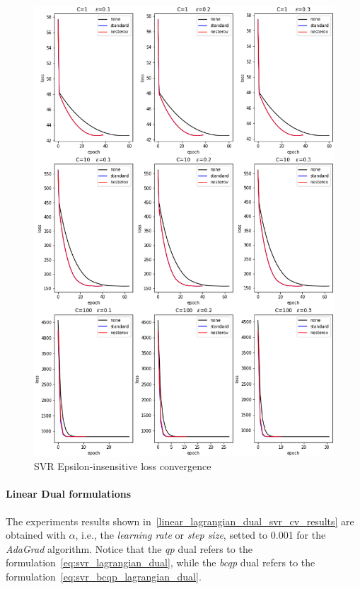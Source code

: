 \begin{figure}[H]
	\centering
	\includegraphics[scale=0.5]{img/svr_eps_loss_history}
	\caption{SVR Epsilon-insensitive loss convergence}
	\label{fig:svr_eps_loss_history}
\end{figure}

\pagebreak

\paragraph{Linear Dual formulations}

The experiments results shown in~\ref{linear_lagrangian_dual_svr_cv_results} are obtained with $\alpha$, i.e., the \emph{learning rate} or \emph{step size}, setted to 0.001 for the \emph{AdaGrad} algorithm. Notice that the \emph{qp} dual refers to the formulation~\eqref{eq:svr_lagrangian_dual}, while the \emph{bcqp} dual refers to the formulation~\eqref{eq:svr_bcqp_lagrangian_dual}.

